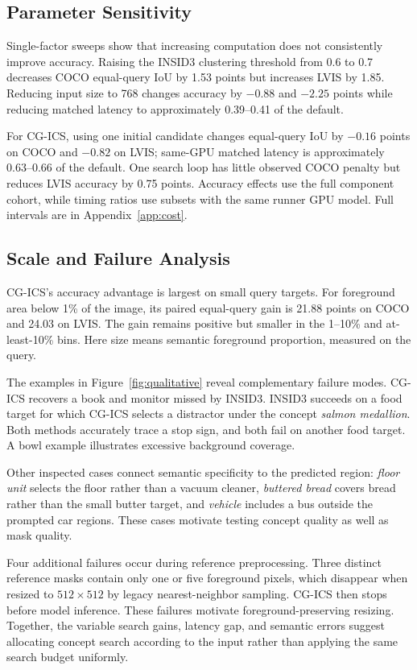\subsection{Parameter Sensitivity}
Single-factor sweeps show that increasing computation does not consistently improve accuracy. Raising the INSID3 clustering threshold from 0.6 to 0.7 decreases COCO equal-query IoU by 1.53 points but increases LVIS by 1.85. Reducing input size to 768 changes accuracy by $-0.88$ and $-2.25$ points while reducing matched latency to approximately 0.39--0.41 of the default.

For CG-ICS, using one initial candidate changes equal-query IoU by $-0.16$ points on COCO and $-0.82$ on LVIS; same-GPU matched latency is approximately 0.63--0.66 of the default. One search loop has little observed COCO penalty but reduces LVIS accuracy by 0.75 points. Accuracy effects use the full component cohort, while timing ratios use subsets with the same runner GPU model. Full intervals are in Appendix~\ref{app:cost}.

\subsection{Scale and Failure Analysis}
CG-ICS's accuracy advantage is largest on small query targets. For foreground area below 1\% of the image, its paired equal-query gain is 21.88 points on COCO and 24.03 on LVIS. The gain remains positive but smaller in the 1--10\% and at-least-10\% bins. Here size means semantic foreground proportion, measured on the query.



The examples in Figure~\ref{fig:qualitative} reveal complementary failure modes. CG-ICS recovers a book and monitor missed by INSID3. INSID3 succeeds on a food target for which CG-ICS selects a distractor under the concept \emph{salmon medallion}. Both methods accurately trace a stop sign, and both fail on another food target. A bowl example illustrates excessive background coverage.

Other inspected cases connect semantic specificity to the predicted region: \emph{floor unit} selects the floor rather than a vacuum cleaner, \emph{buttered bread} covers bread rather than the small butter target, and \emph{vehicle} includes a bus outside the prompted car regions. These cases motivate testing concept quality as well as mask quality.

Four additional failures occur during reference preprocessing. Three distinct reference masks contain only one or five foreground pixels, which disappear when resized to $512\times512$ by legacy nearest-neighbor sampling. CG-ICS then stops before model inference. These failures motivate foreground-preserving resizing. Together, the variable search gains, latency gap, and semantic errors suggest allocating concept search according to the input rather than applying the same search budget uniformly.


